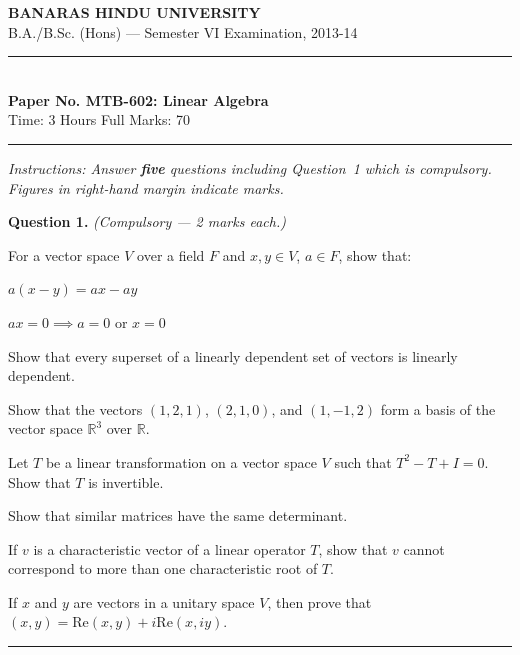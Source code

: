 \documentclass[11pt,a4paper]{article}
\begin{document}
\begin{center}
  {\large\bfseries BANARAS HINDU UNIVERSITY}\\[2pt]
  {\normalsize B.A./B.Sc. (Hons) --- Semester VI Examination, 2013-14}\\[6pt]
  \rule{0.8\linewidth}{0.5pt}\\[6pt]
  {\large\bfseries Paper No. MTB-602: Linear Algebra}\\[4pt]
  {\normalsize Time: 3 Hours \hfill Full Marks: 70}
\end{center}
\rule{\linewidth}{0.4pt}
\smallskip



\noindent   \textit{Instructions: Answer   \textbf{five} questions including Question~1 which is compulsory. Figures in right-hand margin indicate marks.}
\bigskip




\noindent   \textbf{Question 1.}   \textit{(Compulsory --- 2 marks each.)}

\begin{parts}
  \item For a vector space $V$ over a field $F$ and $x, y \in V$, $a \in F$, show that:
  
\begin{parts}
    \item $a(x-y) = ax - ay$
    \item $ax = 0 \implies a = 0$ or $x = 0$
  \end{parts}
  \item Show that every superset of a linearly dependent set of vectors is linearly dependent.
  \item Show that the vectors $(1, 2, 1)$, $(2, 1, 0)$, and $(1, -1, 2)$ form a basis of the vector space $\mathbb{R}^3$ over $\mathbb{R}$.
  \item Let $T$ be a linear transformation on a vector space $V$ such that $T^2 - T + I = 0$. Show that $T$ is invertible.
  \item Show that similar matrices have the same determinant.
  \item If $v$ is a characteristic vector of a linear operator $T$, show that $v$ cannot correspond to more than one characteristic root of $T$.
  \item If $x$ and $y$ are vectors in a unitary space $V$, then prove that $(x, y) =  \text{Re}(x, y) + i  \text{Re}(x, iy)$.
\end{parts}

\medskip\rule{\linewidth}{0.2pt}
\end{document}
